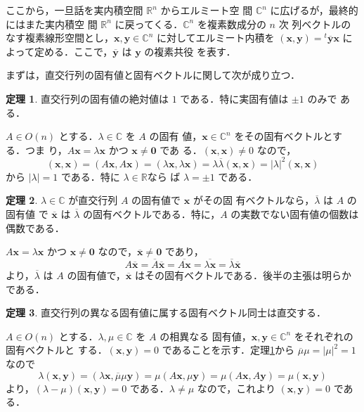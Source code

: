\documentclass[11pt, uplatex, dvipdfmx, titlepage]{jsarticle}
\makeatletter
\renewcommand{\bar}[1]{\overline{#1}}
\renewenvironment{proof}[1][\proofname]{\par
  \pushQED{\qed}%
  \normalfont \topsep6\p@\@plus6\p@\relax
  \trivlist
  \item[\hskip\labelsep
         \bfseries
    {#1}]\ignorespaces
}{%
  \popQED\endtrivlist\@endpefalse
}
\theoremstyle{definition}
\newtheorem{theorem}{定理}[section]
\renewcommand{\proofname}{\textbf{証明}}
\makeatother
\begin{document}
  ここから，一旦話を実内積空間 $\mathbb{R}^n$ からエルミート空
  間 $\mathbb{C}^n$ に広げるが，最終的にはまた実内積空
  間 $\mathbb{R}^n$ に戻ってくる．$\mathbb{C}^n$ を複素数成分の $n$ 次
  列ベクトルのなす複素線形空間とし，$\bm{x}, \bm{y} \in \mathbb{C}^n$
  に対してエルミート内積を $(\bm{x}, \bm{y}) = {}^{t} \bar{\bm{y}}
  \bm{x}$ によって定める．ここで，$\bar{\bm{y}}$ は $\bm{y}$ の複素共役
  を表す．

  まずは，直交行列の固有値と固有ベクトルに関して次が成り立つ．
  
\begin{theorem}\label{thm:eigenvalue}
  直交行列の固有値の絶対値は $1$ である．特に実固有値は $\pm 1$ のみで
  ある．
\end{theorem}

\begin{proof}
  $A \in O(n)$ とする．$\lambda \in \mathbb{C}$ を $A$ の固有
  値，$\bm{x} \in \mathbb{C}^n$ をその固有ベクトルとする．つま
  り，$A\bm{x} = \lambda \bm{x}$ かつ $\bm{x} \neq \bm{0}$ であ
  る．$(\bm{x}, \bm{x}) \neq 0$ なので，
  \[
    (\bm{x}, \bm{x}) = (A\bm{x}, A\bm{x}) = (\lambda \bm{x}, \lambda
    \bm{x}) = \lambda \bar{\lambda} (\bm{x}, \bm{x}) = |\lambda|^2
    (\bm{x}, \bm{x})
  \]
  から $|\lambda|=1$ である．特に $\lambda \in \mathbb{R}$なら
  ば $\lambda= \pm 1$ である．
\end{proof}

\begin{theorem}\label{thm:eigen-conj}
  $\lambda \in \mathbb{C}$ が直交行列 $A$ の固有値で $\bm{x}$ がその固
  有ベクトルなら，$\bar{\lambda}$ は $A$ の固有値
  で $\bar{\bm{x}}$ は $\bar{\lambda}$ の固有ベクトルである．特に，$A$
  の実数でない固有値の個数は偶数である．
\end{theorem}

\begin{proof}
  $A\bm{x} = \lambda \bm{x}$ かつ $\bm{x} \neq \bm{0}$ なので，$\bar{\bm{x}} \neq \bm{0}$ であり，
  \[
    A \bar{\bm{x}} = \bar{A}\bar{\bm{x}} = \bar{A\bm{x}} = \bar{\lambda \bm{x}} = \bar{\lambda} \bar{\bm{x}}
  \]
  より，$\bar{\lambda}$ は $A$ の固有値で，$\bar{\bm{x}}$ はその固有ベクトルである．後半の主張は明らかである．
\end{proof}

\begin{theorem}\label{thm:eigen-perp}
  直交行列の異なる固有値に属する固有ベクトル同士は直交する．
\end{theorem}

\begin{proof}
  $A \in O(n)$ とする．$\lambda, \mu \in \mathbb{C}$ を $A$ の相異なる
  固有値，$\bm{x}, \bm{y} \in \mathbb{C}^n$ をそれぞれの固有ベクトルと
  する．$(\bm{x}, \bm{y})=0$
  であることを示す．定理\ref{thm:eigenvalue}から $\bar{\mu}\mu= |\mu|^2=1$ なので
  \[
    \lambda(\bm{x}, \bm{y}) = (\lambda \bm{x}, \bar{\mu}\mu \bm{y}) = \mu (A\bm{x}, \mu \bm{y})
    = \mu(A\bm{x}, A\bm{y}) = \mu (\bm{x}, \bm{y})
  \]
  より，$(\lambda - \mu)(\bm{x}, \bm{y})=0$ である．$\lambda \neq \mu$ なので，これより $(\bm{x}, \bm{y})=0$ である．
\end{proof}
\end{document}

